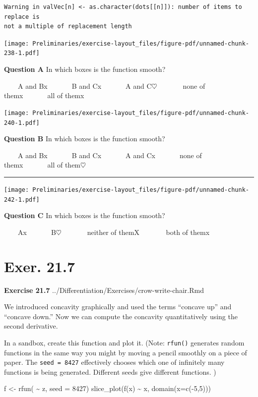 \documentclass[
  letterpaper,
  DIV=11,
  numbers=noendperiod,
  oneside]{article}
\newenvironment{Shaded}{\begin{snugshade}}{\end{snugshade}}
\newcommand{\AttributeTok}[1]{\textcolor[rgb]{0.40,0.45,0.13}{#1}}
\newcommand{\DecValTok}[1]{\textcolor[rgb]{0.68,0.00,0.00}{#1}}
\newcommand{\FunctionTok}[1]{\textcolor[rgb]{0.28,0.35,0.67}{#1}}
\newcommand{\NormalTok}[1]{\textcolor[rgb]{0.00,0.23,0.31}{#1}}
\newcommand{\OtherTok}[1]{\textcolor[rgb]{0.00,0.23,0.31}{#1}}
\newcommand{\SpecialCharTok}[1]{\textcolor[rgb]{0.37,0.37,0.37}{#1}}
\begin{document}
\begin{multicols}{2}
\begin{verbatim}
Warning in valVec[n] <- as.character(dots[[n]]): number of items to replace is
not a multiple of replacement length
\end{verbatim}

\texttt{[image: Preliminaries/exercise-layout\_files/figure-pdf/unnamed-chunk-238-1.pdf]}

\textbf{Question A} In which boxes is the function smooth?

~~~~{A and B{x}}~~~~~~~{B and C{x}}~~~~~~~{A and
C{\(\heartsuit\ \)}}~~~~~~~{none of them{x}}~~~~~~~{all of them{x}}

\texttt{[image: Preliminaries/exercise-layout\_files/figure-pdf/unnamed-chunk-240-1.pdf]}

\textbf{Question B} In which boxes is the function smooth?

~~~~{A and B{x}}~~~~~~~{B and C{x}}~~~~~~~{A and C{x}}~~~~~~~{none
of them{x}}~~~~~~~{all of them{\(\heartsuit\ \)}}

\begin{center}\rule{0.5\linewidth}{0.5pt}\end{center}

\texttt{[image: Preliminaries/exercise-layout\_files/figure-pdf/unnamed-chunk-242-1.pdf]}

\textbf{Question C} In which boxes is the function smooth?

~~~~{A{x}}~~~~~~~{B{\(\heartsuit\ \)}}~~~~~~~{neither of them{︎X
}}~~~~~~~{both of them{x}}

\hypertarget{exer.-21.7}{%
\section*{Exer. 21.7}\label{exer.-21.7}}

\textbf{Exercise 21.7} ../Differentiation/Exercises/crow-write-chair.Rmd

We introduced concavity graphically and used the terms ``concave up''
and ``concave down.'' Now we can compute the concavity quantitatively
using the second derivative.

In a sandbox, create this function and plot it. (Note: \texttt{rfun()}
generates random functions in the same way you might by moving a pencil
smoothly on a piece of paper. The \texttt{seed\ =\ 8427} effectively
chooses which one of infinitely many functions is being generated.
Different seeds give different functions. )

\begin{Shaded}
\begin{Highlighting}[]
\NormalTok{f }\OtherTok{\textless{}{-}} \FunctionTok{rfun}\NormalTok{( }\SpecialCharTok{\textasciitilde{}}\NormalTok{ z, }\AttributeTok{seed =} \DecValTok{8427}\NormalTok{)}
\FunctionTok{slice\_plot}\NormalTok{(}\FunctionTok{f}\NormalTok{(x) }\SpecialCharTok{\textasciitilde{}}\NormalTok{ x, }\FunctionTok{domain}\NormalTok{(}\AttributeTok{x=}\FunctionTok{c}\NormalTok{(}\SpecialCharTok{{-}}\DecValTok{5}\NormalTok{,}\DecValTok{5}\NormalTok{)))}
\end{Highlighting}
\end{Shaded}


\end{multicols}
\end{document}
